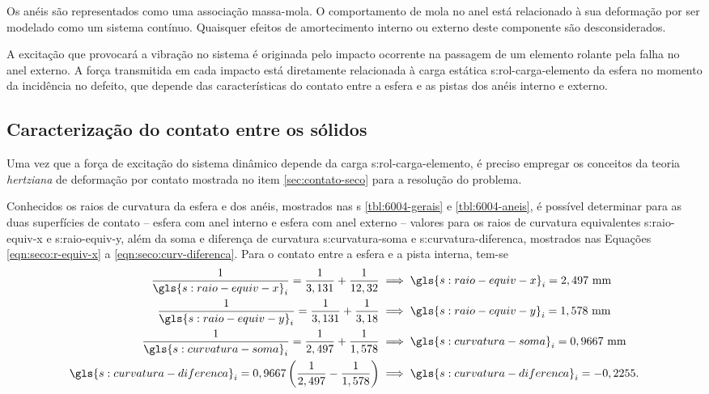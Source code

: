 \documentclass[12pt,oneside,english,brazil,lmodern,siglas,simbolos,cite=num]{ucsmonograph}
\begin{document}
	Os anéis são representados como uma associação massa-mola.
	O comportamento de mola no anel está relacionado à sua deformação por ser modelado como um sistema contínuo.
	Quaisquer efeitos de amortecimento interno ou externo deste componente são desconsiderados.
	
	A excitação que provocará a vibração no sistema é originada pelo impacto ocorrente na passagem de um elemento rolante pela falha no anel externo.
	A força transmitida em cada impacto está diretamente relacionada à carga estática \gls{s:rol-carga-elemento} da esfera no momento da incidência no defeito, que depende das características do contato entre a esfera e as pistas dos anéis interno e externo.
		
	\begin{figure}[t]
		\label{fig:modelo-dinamico}
	\end{figure}
	
	\subsection{Caracterização do contato entre os sólidos}
	Uma vez que a força de excitação do sistema dinâmico depende da carga \gls{s:rol-carga-elemento}, é preciso empregar os conceitos da teoria \emph{hertziana} de deformação por contato mostrada no item \ref{sec:contato-seco} para a resolução do problema.
	
	Conhecidos os raios de curvatura da esfera e dos anéis, mostrados nas \tablename s \ref{tbl:6004-gerais} e \ref{tbl:6004-aneis}, é possível determinar para as duas superfícies de contato -- esfera com anel interno e esfera com anel externo -- valores para os raios de curvatura equivalentes \gls{s:raio-equiv-x} e \gls{s:raio-equiv-y}, além da soma e diferença de curvatura \gls{s:curvatura-soma} e \gls{s:curvatura-diferenca}, mostrados nas Equações \ref{eqn:seco:r-equiv-x} a \ref{eqn:seco:curv-diferenca}.
	Para o contato entre a esfera e a pista interna, tem-se
	\begin{align*}
		\frac{1}{\gls{s:raio-equiv-x}_i} = \frac{1}{3,131} +
		\frac{1}{12,32} &\implies \gls{s:raio-equiv-x}_i =
		2,497\ \text{mm} \\
		\frac{1}{\gls{s:raio-equiv-y}_i} = \frac{1}{3,131} +
		\frac{1}{3,18} &\implies \gls{s:raio-equiv-y}_i =
		1,578\ \text{mm} \\
		\frac{1}{\gls{s:curvatura-soma}_i} = \frac{1}{2,497} +
		\frac{1}{1,578} &\implies \gls{s:curvatura-soma}_i =
		0,9667\ \text{mm}\\
		\gls{s:curvatura-diferenca}_i = 0,9667\left( 
		\frac{1}{2,497} - \frac{1}{1,578} \right) &\implies
		\gls{s:curvatura-diferenca}_i = -0,2255.
	\end{align*}
	
\end{document}
